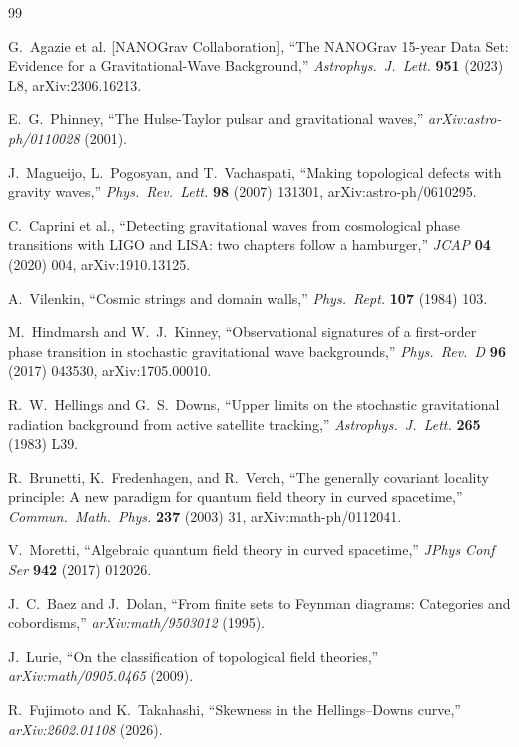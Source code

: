 \documentclass[11pt,a4paper]{article}
\begin{document}
\begin{thebibliography}{99}

G.~Agazie et al. [NANOGrav Collaboration],
``The NANOGrav 15-year Data Set: Evidence for a Gravitational-Wave Background,''
\textit{Astrophys.\ J.\ Lett.} \textbf{951} (2023) L8, arXiv:2306.16213.

E.~G.~Phinney,
``The Hulse-Taylor pulsar and gravitational waves,''
\textit{arXiv:astro-ph/0110028} (2001).

J.~Magueijo, L.~Pogosyan, and T.~Vachaspati,
``Making topological defects with gravity waves,''
\textit{Phys.\ Rev.\ Lett.} \textbf{98} (2007) 131301, arXiv:astro-ph/0610295.

C.~Caprini et al.,
``Detecting gravitational waves from cosmological phase transitions with LIGO and LISA: two chapters follow a hamburger,''
\textit{JCAP} \textbf{04} (2020) 004, arXiv:1910.13125.

A.~Vilenkin,
``Cosmic strings and domain walls,''
\textit{Phys.\ Rept.} \textbf{107} (1984) 103.

M.~Hindmarsh and W.~J.~Kinney,
``Observational signatures of a first-order phase transition in stochastic gravitational wave backgrounds,''
\textit{Phys.\ Rev.\ D} \textbf{96} (2017) 043530, arXiv:1705.00010.

R.~W.~Hellings and G.~S.~Downs,
``Upper limits on the stochastic gravitational radiation background from active satellite tracking,''
\textit{Astrophys.\ J.\ Lett.} \textbf{265} (1983) L39.

R.~Brunetti, K.~Fredenhagen, and R.~Verch,
``The generally covariant locality principle: A new paradigm for quantum field theory in curved spacetime,''
\textit{Commun.\ Math.\ Phys.} \textbf{237} (2003) 31, arXiv:math-ph/0112041.

V.~Moretti,
``Algebraic quantum field theory in curved spacetime,''
\textit{JPhys Conf Ser} \textbf{942} (2017) 012026.

J.~C.~Baez and J.~Dolan,
``From finite sets to Feynman diagrams: Categories and cobordisms,''
\textit{arXiv:math/9503012} (1995).

J.~Lurie,
``On the classification of topological field theories,''
\textit{arXiv:math/0905.0465} (2009).

R.~Fujimoto and K.~Takahashi,
``Skewness in the Hellings--Downs curve,''
\textit{arXiv:2602.01108} (2026).


\end{thebibliography}
\end{document}
